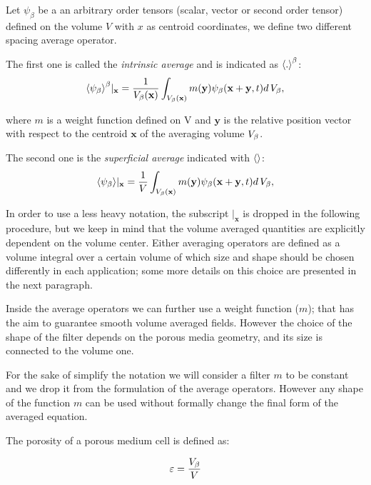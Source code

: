 Let $\psi_{\beta}$ be a an arbitrary order tensors (scalar, vector or second order tensor) defined on the volume $V$ with $x$ as centroid coordinates, we define two different spacing average operator.

The first one is called the \textit{intrinsic average} and is indicated as ${\left< . \right>}^{\beta}$:
\begin{equation}
	{\left< \psi_{\beta} \right>}^{\beta}|_{\mathbf{x}} = \dfrac{1}{V_\beta(\mathbf{x})} \int_{V_\beta(\mathbf{x})}  m(\mathbf{y}) \psi_{\beta}(\mathbf{x}+\mathbf{y}, t) d \, V_\beta,
	\label{eq:avg_intrinsic}
\end{equation}

where $m$ is a weight function defined on V and $\mathbf{y}$ is the relative position vector with respect to the centroid $\mathbf{x}$ of the averaging volume $V_\beta$.

The second one is the \textit{superficial average} indicated with ${\left<  \right>}$:
\begin{equation}
	{\left< \psi_{\beta} \right>}|_{\mathbf{x}} = \dfrac{1}{V} \int_{V_\beta(\mathbf{x})} m(\mathbf{y}) \psi_{\beta}(\mathbf{x}+\mathbf{y}, t) d \, V_\beta,
	\label{eq:avg_superficial}
\end{equation}

In order to use a less heavy notation, the subscript $|_{\mathbf{x}}$ is dropped in the following procedure, but we keep in mind that the volume averaged quantities are explicitly dependent on the volume center.
Either averaging operators are defined as a volume integral over a certain volume of which size and shape should be chosen differently in each application; some more details on this choice are presented in the next paragraph.

Inside the average operators we can further use a weight function ($m$); that has the aim to guarantee smooth volume averaged fields.
However the choice of the shape of the filter depends on the porous media geometry, and its size is connected to the volume one.

For the sake of simplify the notation we will consider a filter $m$ to be constant and we drop it from the formulation of the average operators.
However any shape of the function $m$ can be used without formally change the final form of the averaged equation.

The porosity of a porous medium cell is defined as:

\begin{equation}
	\varepsilon = \dfrac{V_\beta}{V}
	\label{eq:porosity}
\end{equation}

